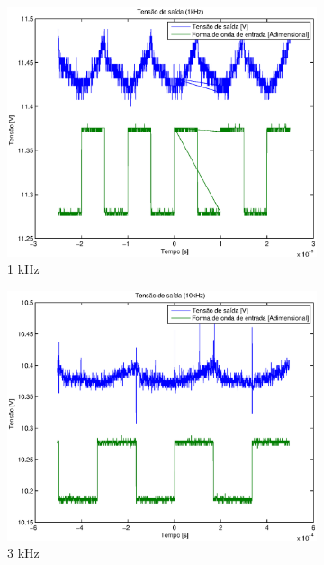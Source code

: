 \documentclass{article}
\begin{document}
\begin{figure}[H]
	\begin{subfigure}[b]{0.3\textwidth}
		\centering
		\includegraphics[width=\textwidth]{Dados/buck/t1k}
		\caption{1 kHz}
	\end{subfigure}
	\begin{subfigure}[b]{0.3\textwidth}
		\centering
		\includegraphics[width=\textwidth]{Dados/buck/t3k}
		\caption{3 kHz}
	\end{subfigure}
	\begin{subfigure}[b]{0.3\textwidth}
		\centering

\end{subfigure}
\end{figure}
\end{document}
